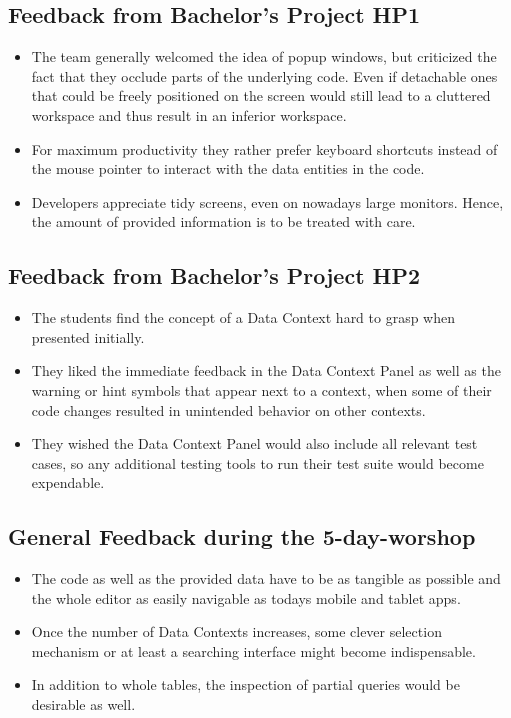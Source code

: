 \subsection{Feedback from Bachelor's Project HP1}
\label{subsec:FeedbackBPHP1}
\begin{itemize}
	\item The team generally welcomed the idea of popup windows, but criticized the fact that they occlude parts of the underlying code. Even if detachable ones that could be freely positioned on the screen would still lead to a cluttered workspace and thus result in an inferior workspace.

	\item For maximum productivity they rather prefer keyboard shortcuts instead of the mouse pointer to interact with the data entities in the code.

	\item Developers appreciate tidy screens, even on nowadays large monitors. Hence, the amount of provided information is to be treated with care.
\end{itemize}

\subsection{Feedback from Bachelor's Project HP2}
\label{subsec:FeedbackBPHP2}
\begin{itemize}
	\item The students find the concept of a Data Context hard to grasp when presented initially.

	\item They liked the immediate feedback in the Data Context Panel as well as the warning or hint symbols that appear next to a context, when some of their code changes resulted in unintended behavior on other contexts.

	\item They wished the Data Context Panel would also include all relevant test cases, so any additional testing tools to run their test suite would become expendable.
\end{itemize}


\subsection{General Feedback during the 5-day-worshop}
\label{subsec:FeedbackWeek}
\begin{itemize}
	\item The code as well as the provided data have to be as tangible as possible and the whole editor as easily navigable as todays mobile and tablet apps.

	\item Once the number of Data Contexts increases, some clever selection mechanism or at least a searching interface might become indispensable.

	\item In addition to whole tables, the inspection of partial queries would be desirable as well.
\end{itemize}


